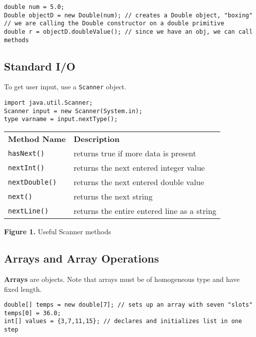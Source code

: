 \documentclass{article}
\newcommand{\nline}{\vspace{\baselineskip}}
\begin{document}
\begin{flushleft}
\nline

\begin{verbatim}
double num = 5.0;
Double objectD = new Double(num); // creates a Double object, "boxing"
// we are calling the Double constructor on a double primitive
double r = objectD.doubleValue(); // since we have an obj, we can call methods
\end{verbatim}

\subsection{Standard I/O}

To get user input, use a \texttt{Scanner} object.

\begin{verbatim}
import java.util.Scanner;
Scanner input = new Scanner(System.in);
type varname = input.nextType();
\end{verbatim}

\begin{center}
\begin{tabular}{ l l }
\textbf{Method Name} & \textbf{Description} \\
\texttt{hasNext()} & returns true if more data is present \\
\texttt{nextInt()} & returns the next entered integer value \\
\texttt{nextDouble()} & returns the next entered double value \\
\texttt{next()} & returns the next string \\
\texttt{nextLine()} & returns the entire entered line as a string \\
\end{tabular}
\vspace{\baselineskip}

\textbf{Figure 1.} Useful Scanner methods
\end{center}

\subsection{Arrays and Array Operations}

\textbf{Arrays} are objects. Note that arrays must be of homogeneous type and have fixed length.

\begin{verbatim}
double[] temps = new double[7]; // sets up an array with seven "slots"
temps[0] = 36.0;
int[] values = {3,7,11,15}; // declares and initializes list in one step
\end{verbatim}


\end{flushleft}
\end{document}
